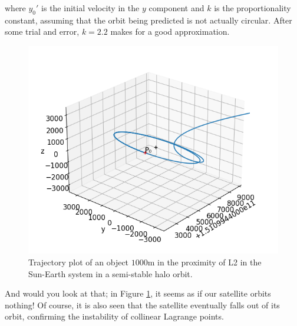 \begin{samepage}
\begin{equation*}
\end{equation*}
where $y_0'$ is the initial velocity in the $y$ component and $k$ is the proportionality constant, assuming that the orbit being predicted is not actually circular.
After some trial and error, $k = 2.2$ makes for a good approximation.
\begin{figure}[H]
	\centering
	\includegraphics[scale=0.52]{figures/xyzplot2.png}
	\caption{Trajectory plot of an object $1000\si{\metre}$ in the proximity of L2 in the Sun-Earth system in a semi-stable halo orbit.}
	\label{fig:3dplot2}
\end{figure}
\end{samepage}
And would you look at that; in Figure \ref{fig:3dplot2}, it seems as if our satellite orbits nothing!
Of course, it is also seen that the satellite eventually falls out of its orbit, confirming the instability of collinear Lagrange points.

